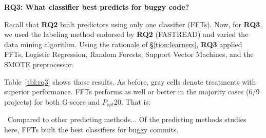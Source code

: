 \documentclass[10pt,journal,compsoc]{IEEEtran}
\newcommand{\tbl}[1]{Table~\ref{tbl:#1}}
\newcommand{\tion}[1]{\S\ref{tion:#1}}
\newenvironment{RQ}[1]%
{\noindent\begin{minipage}[c]{\linewidth}%
\begin{bclogo}[couleur=gray!25,%
                arrondi=0.1,%
                logo=\bctrombone,%
                ombre=true]{{\normalsize ~#1}}}%
{\end{bclogo}\end{minipage}\vspace{2mm}}
\begin{document}



{\bf RQ3:  What classifier  best predicts for buggy code?}

Recall that
{\bf RQ2} built predictors using only one classifier (FFTs). 
Now, for {\bf RQ3},  we used the labeling method endorsed
by {\bf RQ2} (FASTREAD) and varied
the data mining algorithm.
Using the rationale of 
\tion{learners},
{\bf RQ3} applied
FFTs, Logistic Regression, Random Forests,
Support Vector Machines, and the SMOTE preprocessor.


\tbl{rq3} shows those results.
As before, 
gray cells denote treatments with superior performance. FFTs performs as well or better in the majority cases (6/9 projects) for both G-score and $P_{opt}20$. That is:
 

\begin{RQ}{Compared to other predicting methods...} 
Of  the  predicting methods  studies  here,
FFTs built the best classifiers for buggy commits.
\end{RQ}
\end{document}
